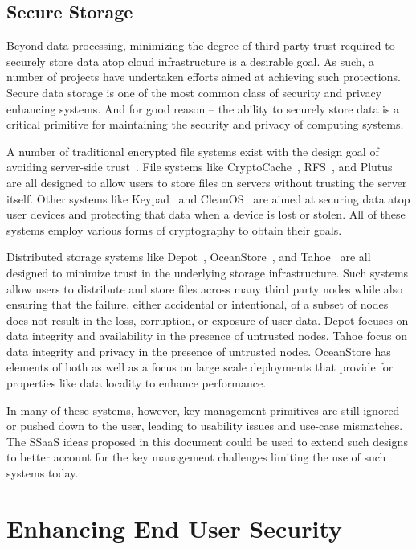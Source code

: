 \subsection{Secure Storage}

Beyond data processing, minimizing the degree of third party trust
required to securely store data atop cloud infrastructure is a
desirable goal. As such, a number of projects have undertaken efforts
aimed at achieving such protections. Secure data storage is one of the
most common class of security and privacy enhancing systems. And for
good reason -- the ability to securely store data is a critical
primitive for maintaining the security and privacy of computing
systems.

A number of traditional encrypted file systems exist with the design
goal of avoiding server-side trust~\cite{kher2005}. File systems like
CryptoCache~\cite{jensen2000}, RFS~\cite{dong2011}, and
Plutus~\cite{kallahalla2003} are all designed to allow users to store
files on servers without trusting the server itself. Other systems
like Keypad~\cite{geambasu2011} and CleanOS~\cite{tang2012} are aimed
at securing data atop user devices and protecting that data when a
device is lost or stolen. All of these systems employ various forms of
cryptography to obtain their goals.
 
Distributed storage systems like Depot~\cite{mahajan2011},
OceanStore~\cite{kubiatowicz2000}, and Tahoe~\cite{wilcox-o'hearn2008}
are all designed to minimize trust in the underlying storage
infrastructure. Such systems allow users to distribute and store files
across many third party nodes while also ensuring that the failure,
either accidental or intentional, of a subset of nodes does not result
in the loss, corruption, or exposure of user data. Depot focuses on
data integrity and availability in the presence of untrusted
nodes. Tahoe focus on data integrity and privacy in the presence of
untrusted nodes. OceanStore has elements of both as well as a focus on
large scale deployments that provide for properties like data locality
to enhance performance.

In many of these systems, however, key management primitives are still
ignored or pushed down to the user, leading to usability issues and
use-case mismatches. The SSaaS ideas proposed in this document could
be used to extend such designs to better account for the key
management challenges limiting the use of such systems today.

\section{Enhancing End User Security}
\label{chap:related:enduser}

